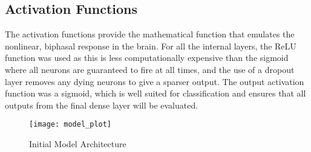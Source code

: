 \subsection{Activation Functions}
The activation functions provide the mathematical function that emulates the nonlinear, biphasal response in the brain. For all the internal layers, the ReLU function was used as this is less computationally expensive than the sigmoid where all neurons are guaranteed to fire at all times, and the use of a dropout layer removes any dying neurons to give a sparser output. 
The output activation function was a sigmoid, which is well suited for classification and ensures that all outputs from the final dense layer will be evaluated.

\begin{figure}[h]
	\centering
	\texttt{[image: model\_plot]}
	\caption{Initial Model Architecture}
	\label{init_architecture}
\end{figure}

